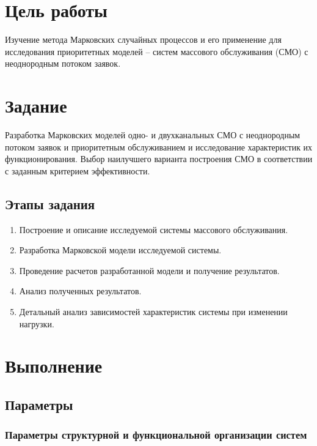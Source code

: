 


\usepackage{graphicx}
\usepackage{adjustbox}
\usepackage{multirow}

\def \labnum {2}
\def \labtype {Домашняя}
\def \labsubj {Моделирование}
\def \labauthor {Чебыкин И. Б.}
\def \labgroup {P3301}
\def \labinsp {Муравьева-Витковская Л. А.}
\def \labname {Вариант: 23/5}

\isnametrue
\lstset{
	caption=\lstname,
	basicstyle=\ttfamily\selectfont\scriptsize
}


\tableofcontents
\newpage
\section{Цель работы}
Изучение метода Марковских случайных процессов и его
применение для исследования приоритетных моделей – систем массового
обслуживания (СМО) с неоднородным потоком заявок.
\section{Задание}
Разработка Марковских моделей одно- и двухканальных СМО с
неоднородным потоком заявок и приоритетным обслуживанием и
исследование характеристик их функционирования. Выбор наилучшего
варианта построения СМО в соответствии с заданным критерием
эффективности.
\subsection{Этапы задания}
\begin{enumerate}
	\item Построение и описание исследуемой системы массового обслуживания.
	\item Разработка Марковской модели исследуемой системы.
	\item Проведение расчетов разработанной модели и получение результатов.
	\item Анализ полученных результатов.
	\item Детальный анализ зависимостей характеристик системы при изменении
	нагрузки.
\end{enumerate}
\section{Выполнение}
\subsection{Параметры}

\subsubsection{Параметры структурной и функциональной организации систем}


